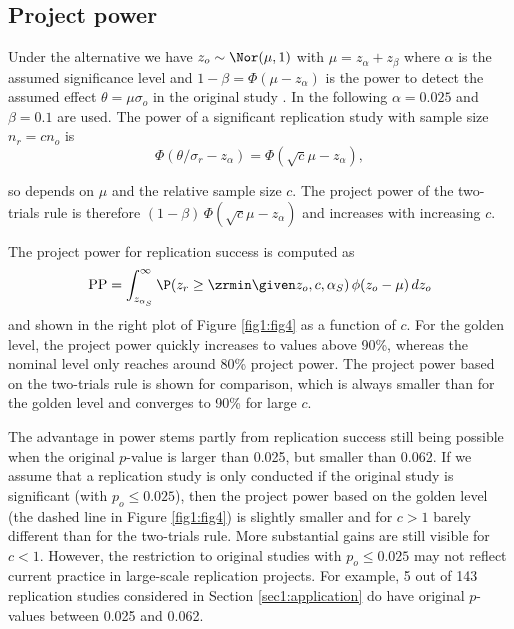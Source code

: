 \subsection{Project power}\label{sec1:PP}
Under the alternative we have $z_o\sim \Nor(\mu, 1)$ with
$\mu = z_\alpha + z_\beta$ where $\alpha$ is the assumed significance level and
$1-\beta = \Phi(\mu - z_\alpha)$ is the power to detect the assumed effect
$\theta = \mu \sigma_o$ in the original study \citep[Section 3.3]{Matthews2006}.
In the following $\alpha=0.025$ and $\beta=0.1$ are used. The power of a
significant replication study with sample size $n_r = c n_o$ is
\begin{equation*}
\Phi(\theta/\sigma_r - z_\alpha) =
\Phi(\sqrt{c} \mu - z_\alpha),
\end{equation*}

so depends on $\mu$ and the relative sample size $c$. The project power of the
two-trials rule is therefore $(1-\beta) \, \Phi(\sqrt{c} \mu - z_\alpha)$ and
increases with increasing $c$.


The project power for replication success is computed as
\begin{equation*}
  \mbox{PP} = \int_{z_{\alpha_S}}^{\infty}
\P(z_r \geq \zrmin \given z_o, c, \alpha_S) \,
  \phi(z_o - \mu) \, dz_o
\end{equation*}
and shown in the right plot of Figure \ref{fig1:fig4} as a function of $c$. For
the golden level, the project power quickly increases to values above 90\%,
whereas the nominal level only reaches around 80\% project power. The project
power based on the two-trials rule is shown for comparison, which is always
smaller than for the golden level and converges to 90\% for large $c$.

The advantage in power stems partly from replication success still being
possible when the original $p$-value is larger than 0.025, but smaller than
0.062. If we assume that a replication study is only conducted if the original
study is significant (with $p_o \leq 0.025$), then the project power based on
the golden level (the dashed line in Figure \ref{fig1:fig4}) is slightly smaller
and for $c>1$ barely different than for the two-trials rule. More substantial
gains are still visible for $c < 1$. However, the restriction to original
studies with $p_o \leq 0.025$ may not reflect current practice in large-scale
replication projects. For example, 5 out of 143 replication studies considered
in Section \ref{sec1:application} do have original $p$-values between 0.025 and
0.062.


